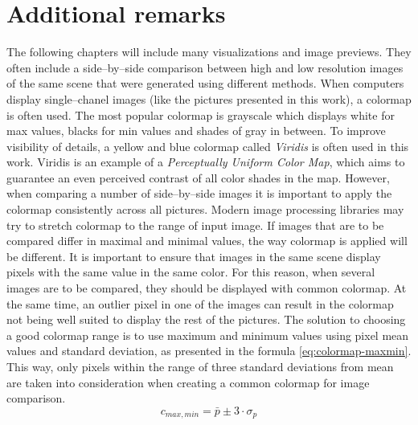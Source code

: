 \section{Additional remarks}
The following chapters will include many visualizations and image previews.
They often include a side--by--side comparison between high and low resolution images of the same scene that were generated using different methods.
When computers display single--chanel images (like the pictures presented in this work), a colormap is often used.
The most popular colormap is grayscale which displays white for max values, blacks for min values and shades of gray in between.
To improve visibility of details, a yellow and blue colormap called \textit{Viridis} is often used in this work.
Viridis is an example of a \textit{Perceptually Uniform Color Map}, which aims to guarantee an even perceived contrast of all color shades in the map.
However, when comparing a number of side--by--side images it is important to apply the colormap consistently across all pictures.
Modern image processing libraries may try to stretch colormap to the range of input image.
If images that are to be compared differ in maximal and minimal values, the way colormap is applied will be different.
It is important to ensure that images in the same scene display pixels with the same value in the same color.
For this reason, when several images are to be compared, they should be displayed with common colormap.
At the same time, an outlier pixel in one of the images can result in the colormap not being well suited to display the rest of the pictures.
The solution to choosing a good colormap range is to use maximum and minimum values using pixel mean values and standard deviation, as presented in the formula \ref{eq:colormap-maxmin}.
This way, only pixels within the range of three standard deviations from mean are taken into consideration when creating a common colormap for image comparison.
\begin{equation}
	c_{max,min} = \bar{p} \pm 3 \cdot \sigma_p
\label{eq:colormap-maxmin}
\end{equation}
  
